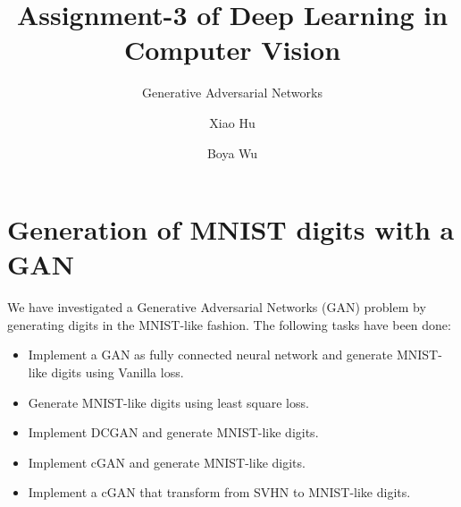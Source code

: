 \documentclass[runningheads]{llncs}
\begin{document}
	

	
%
\title{Assignment-3 of Deep Learning in Computer Vision}
\subtitle{Generative Adversarial Networks}
%
%
\author{Xiao Hu \and
Boya Wu}

%
\maketitle              %
%

%
\section{Generation of MNIST digits with a GAN}
We have investigated a Generative Adversarial Networks (GAN) problem by generating digits in the MNIST-like fashion. The following tasks have been done:
\begin{itemize}
    \item Implement a GAN as fully connected neural network and generate MNIST-like digits using Vanilla loss.
    \item Generate MNIST-like digits using least square loss.
    \item Implement DCGAN and generate MNIST-like digits.
    \item Implement cGAN and generate MNIST-like digits.
    \item Implement a cGAN that transform from SVHN to MNIST-like digits.
\end{itemize}
\end{document}
